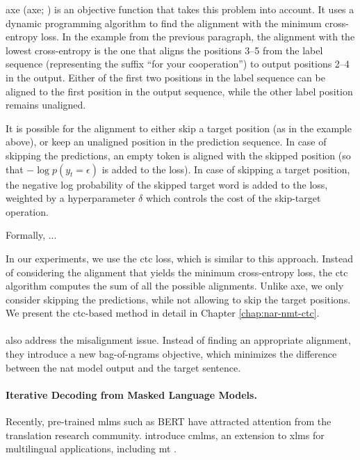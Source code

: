 \Acl{axe}  (\acs{axe}; \citealp{ghazvininejad2020aligned}) is an
objective function that takes this problem into account. It uses a dynamic
programming algorithm to find the alignment with the minimum cross-entropy
loss. In the example from the previous paragraph, the alignment with the lowest
cross-entropy is the one that aligns the positions 3--5 from the label sequence
(representing the suffix ``for your cooperation'') to output positions 2--4 in
the output. Either of the first two positions in the label sequence can be
aligned to the first position in the output sequence, while the other label
position remains unaligned.

It is possible for the alignment to either skip a target position (as in the
example above), or keep an unaligned position in the prediction sequence. In
case of skipping the predictions, an empty token is aligned with the skipped
position (so that $-\log p(y_t = \epsilon)$ is added to the loss). In case of
skipping a target position, the negative log probability of the skipped target
word is added to the loss, weighted by a hyperparameter $\delta$ which controls
the cost of the skip-target operation.

Formally, ... 

In our experiments, we use the \ac{ctc} loss, which is similar to this
approach. Instead of considering the alignment that yields the minimum
cross-entropy loss, the \ac{ctc} algorithm computes the sum of all the possible
alignments. Unlike \ac{axe}, we only consider skipping the predictions, while
not allowing to skip the target positions. We present the \ac{ctc}-based method
in detail in Chapter \ref{chap:nar-nmt-ctc}.

\paragraph{} \citet{shao2020minimizing} also address the
misalignment issue. Instead of finding an appropriate alignment, they introduce
a new bag-of-ngrams objective, which minimizes the difference between the
\ac{nat} model output and the target sentence. 



\paragraph{Iterative Decoding from Masked Language Models.} Recently,
pre-trained \acp{mlm} such as BERT \citep{devlin-etal-2019-bert} have attracted
attention from the translation research
community. \citet{ghazvininejad-etal-2019-mask} introduce \acp{cmlm}, an
extension to \acp{xlm} for multilingual applications, including \ac{mt}
\citep{conneau-lample-2019-cross}.

